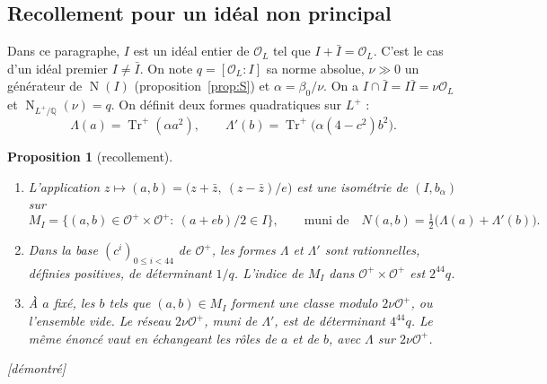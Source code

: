 \documentclass[11pt,a4paper]{amsart}
\theoremstyle{plain}
\newtheorem{proposition}[theoreme]{Proposition}
\theoremstyle{definition}
\numberwithin{equation}{section}
\newcommand{\Q}{\mathbb{Q}}
\newcommand{\OO}{\mathcal{O}}
\newcommand{\Op}{\mathcal{O}^{+}}
\DeclareMathOperator{\Tr}{Tr}
\DeclareMathOperator{\Nm}{N}
\newcommand{\Trp}{\Tr^{+}}
\newcommand{\st}[1]{\textup{\textsf{\small[#1]}}}
\newcommand{\DEM}{\st{démontré}}
\begin{document}
\subsection{Recollement pour un idéal non principal}
Dans ce paragraphe, $I$ est un idéal entier de $\OO_L$ tel que $I+\bar I=\OO_L$. C'est le cas d'un idéal premier $I\ne\bar I$. On note $q=[\OO_L:I]$ sa norme absolue, $\nu\gg0$ un générateur de $\Nm(I)$ (proposition~\ref{prop:S}) et $\alpha=\beta_0/\nu$. On a $I\cap\bar I=I\bar I=\nu\OO_L$ et $\Nm_{L^+/\Q}(\nu)=q$. On définit deux formes quadratiques sur $L^+$ :
\[
\Lambda(a)=\Trp(\alpha a^2),\qquad \Lambda'(b)=\Trp\bigl(\alpha(4-c^2)b^2\bigr).
\]

\begin{proposition}[recollement]\label{prop:recollement}
\begin{enumerate}[label=\textup{(\alph*)}]
\item L'application $z\mapsto(a,b)=\bigl(z+\bar z,\ (z-\bar z)/e\bigr)$ est une isométrie de $(I,b_\alpha)$ sur
\[
M_I=\bigl\{(a,b)\in\Op\times\Op:\ (a+eb)/2\in I\bigr\},\qquad \text{muni de}\quad N(a,b)=\tfrac12\bigl(\Lambda(a)+\Lambda'(b)\bigr).
\]
\item Dans la base $(c^{i})_{0\le i<44}$ de $\Op$, les formes $\Lambda$ et $\Lambda'$ sont rationnelles, définies positives, de déterminant $1/q$. L'indice de $M_I$ dans $\Op\times\Op$ est $2^{44}q$.
\item À $a$ fixé, les $b$ tels que $(a,b)\in M_I$ forment une classe modulo $2\nu\Op$, ou l'ensemble vide. Le réseau $2\nu\Op$, muni de $\Lambda'$, est de déterminant $4^{44}q$. Le même énoncé vaut en échangeant les rôles de $a$ et de $b$, avec $\Lambda$ sur $2\nu\Op$.
\end{enumerate}
\DEM
\end{proposition}
\end{document}

